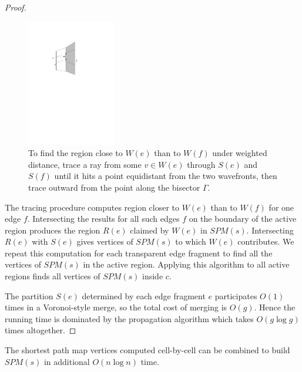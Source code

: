 \begin{proof}
\begin{figure}[H]
	\centering
	\includegraphics[width=0.35\textwidth]{figures/traceray.pdf}
	\caption{To find the region close to $W(e)$ than to $W(f)$ under weighted distance, 
    		 trace a ray from some $v \in W(e)$ through $S(e)$ and $S(f)$ until it hits a point 
             equidistant from the two wavefronts, then trace outward from the point along the bisector 
             $\Gamma$\cite{HershbergerS99}.}
	\label{fig:traceray}
\end{figure}
    
    The tracing procedure computes region closer to
	$W(e)$ than to $W(f)$ for one edge $f$. Intersecting the results for all
	such edges $f$ on the boundary of the active region produces the region
	$R(e)$ claimed by $W(e)$ in $SPM(s)$. Intersecting $R(e)$ with $S(e)$ gives
	vertices of $SPM(s)$ to which $W(e)$ contributes. We repeat this computation
	for each transparent edge fragment to find all the vertices of $SPM(s)$ in
	the active region. Applying this algorithm to all active regions finds all
	vertices of $SPM(s)$ inside $c$.

	The partition $S(e)$ determined by each edge fragment $e$ participates $O(1)$
	times in a Voronoi-style merge, so the total cost of merging is $O(g)$.
	Hence the running time is dominated by the propagation algorithm which takes
	$O(g\log g)$ times altogether.
\end{proof}
\begin{Lemma} \label{lemma:4.13} 
	The shortest path map vertices computed cell-by-cell can be combined to
	build $SPM(s)$ in additional $O(n\log n)$	 time.
\end{Lemma}
